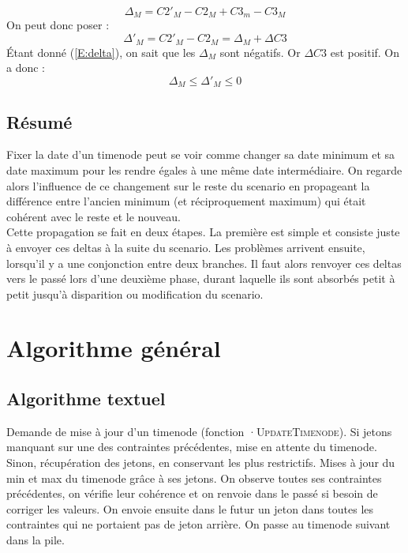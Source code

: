 \documentclass[10pt,a4paper]{article}
\begin{document}
	\begin{equation}
		\Delta{}_M = C2'_M - C2_M + C3_m - C3_M \nonumber
	\end{equation}
On peut donc poser : 
	\begin{equation}
		\Delta{'}_M = C2'_M - C2_M = \Delta{}_M + \Delta{C3} 
	\end{equation}
Étant donné (\ref{E:delta}), on sait que les $\Delta{}_M$ sont négatifs. Or $\Delta{C3}$ est positif. On a donc : 
	\begin{equation}
		\Delta{}_M  \leq \Delta{'}_M  \leq 0
	\end{equation}

	\subsection{Résumé}

Fixer la date d'un timenode peut se voir comme changer sa date minimum et sa date maximum pour les rendre égales à une même date intermédiaire. On regarde alors l'influence de ce changement sur le reste du scenario en propageant la différence entre l'ancien minimum (et réciproquement maximum) qui était cohérent avec le reste et le nouveau. \\

Cette propagation se fait en deux étapes. La première est simple et consiste juste à envoyer ces deltas à la suite du scenario. Les problèmes arrivent ensuite, lorsqu'il y a une conjonction entre deux branches. Il faut alors renvoyer ces deltas vers le passé lors d'une deuxième phase, durant laquelle ils sont absorbés petit à petit jusqu'à disparition ou modification du scenario.

\section{Algorithme général}
	\subsection{Algorithme textuel}

Demande de mise à jour d'un timenode (fonction ·\textsc{UpdateTimenode}). Si jetons manquant sur une des contraintes précédentes, mise en attente du timenode. Sinon, récupération des jetons, en conservant les plus restrictifs. Mises à jour du min et max du timenode grâce à ses jetons. On observe toutes ses contraintes précédentes, on vérifie leur cohérence et on renvoie dans le passé si besoin de corriger les valeurs. On envoie ensuite dans le futur un jeton dans toutes les contraintes qui ne portaient pas de jeton arrière. On passe au timenode suivant dans la pile. \\
\end{document}
